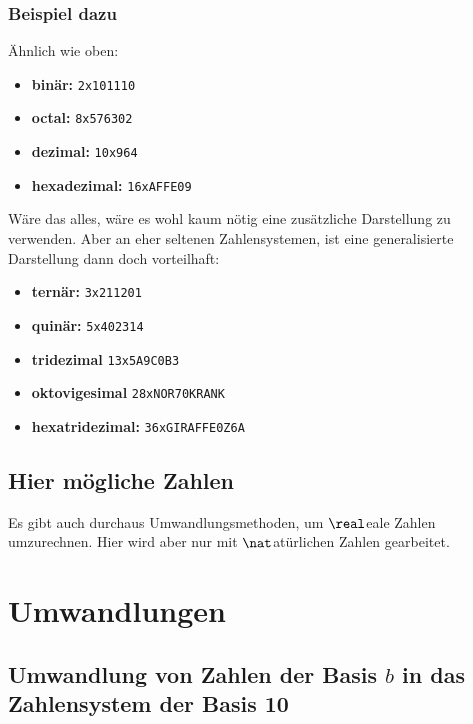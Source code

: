 \documentclass[a4paper,12pt,twoside]{book}
\begin{document}
\subsection{Beispiel dazu}
Ähnlich wie oben:
\begin{itemize}
	\item \textbf{binär:} \texttt{2x101110}
	\item \textbf{octal:} \texttt{8x576302}
	\item \textbf{dezimal:} \texttt{10x964}
	\item \textbf{hexadezimal:} \texttt{16xAFFE09}
\end{itemize} 
Wäre das alles, wäre es wohl kaum nötig eine zusätzliche Darstellung zu verwenden.
Aber an eher seltenen Zahlensystemen, ist eine generalisierte Darstellung dann doch vorteilhaft:
\begin{itemize}
	\item \textbf{ternär:} \texttt{3x211201}
	\item \textbf{quinär:} \texttt{5x402314}
	\item \textbf{tridezimal} \texttt{13x5A9C0B3}
	\item \textbf{oktovigesimal} \texttt{28xNOR70KRANK}
	\item \textbf{hexatridezimal:} \texttt{36xGIRAFFE0Z6A}
\end{itemize}
\section{Hier mögliche Zahlen}
Es gibt auch durchaus Umwandlungsmethoden, um $\real$eale Zahlen umzurechnen.
Hier wird aber nur mit $\nat$atürlichen Zahlen gearbeitet.

\chapter{Umwandlungen}
\section{Umwandlung von Zahlen der Basis $b$ in das Zahlensystem der Basis 10}
\end{document}
